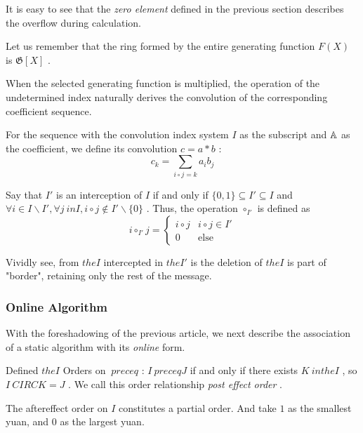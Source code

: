 It is easy to see that the \emph { zero element } defined in the previous section describes the overflow during calculation.

Let us remember that the ring formed by the entire generating function $ F(X) $ is $ \mathfrak G[X] $ .

When the selected generating function is multiplied, the operation of the undetermined index naturally derives the convolution of the corresponding coefficient sequence.

\begin { definition } [convolution]
For the sequence with the convolution index system $ I $ as the subscript and $  \mathbb A $ as the coefficient, we define its convolution $ c = a * b $ :
$$
c_k = \sum _{i \circ j = k} a_i b_j
$$
\end { definition }

\begin { definition } [Intercept]
Say that $ I' $ is an interception of $ I $ if and only if $ \{ 0 , 1 \} \subseteq I' \subseteq I $ and $ \forall i \in I \backslash I', \forall j \ in I, i \circ j \notin I' \backslash  \{ 0 \} $ . Thus, the operation $ \circ _{I'} $ is defined as
$$
i \circ _{I'} j = \begin {cases}
i \circ j & i \circ j \in I' \\
0 & \mathrm {else}
\end {cases}
$$
\end { definition }

Vividly see, from $ the I $ intercepted in $ the I ' $ is the deletion of $ the I $ is part of "border", retaining only the rest of the message.

\subsubsection { Online Algorithm }

With the foreshadowing of the previous article, we next describe the association of a static algorithm with its \emph { online } form.

\begin { definition } 
Defined $ the I $ Orders on $ \ preceq $ : $ I \ preceq J $ if and only if there exists $ K \ in the I $ , so $ I \ CIRC K = J $ . We call this order relationship \emph { post effect order }.
\end { definition }

\begin { lemma }
The aftereffect order on $ I $ constitutes a partial order. And take $ 1 $ as the smallest yuan, and $ 0 $ as the largest yuan.
\end { lemma }


